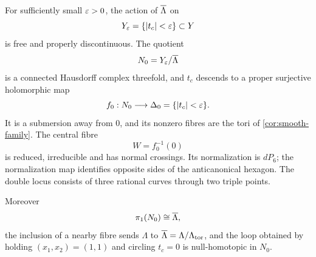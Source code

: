 \begin{theorem}\label{thm:cusp-filling}
For sufficiently small $\varepsilon>0$, the action of $\overline\Lambda$ on
\[
 Y_\varepsilon=\{|t_c|<\varepsilon\}\subset Y
\]
is free and properly discontinuous.  The quotient
\[
 N_0=Y_\varepsilon/\overline\Lambda
\]
is a connected Hausdorff complex threefold, and $t_c$ descends to a proper
surjective holomorphic map
\[
 f_0:N_0\longrightarrow\Delta_0=\{|t_c|<\varepsilon\}.
\]
It is a submersion away from $0$, and its nonzero fibres are the tori of
\cref{cor:smooth-family}.  The central fibre
\[
 W=f_0^{-1}(0)
\]
is reduced, irreducible and has normal crossings.  Its normalization is
$dP_6$; the normalization map identifies opposite sides of the
anticanonical hexagon.  The double locus consists of three rational curves
through two triple points.

Moreover
\[
 \pi_1(N_0)\cong\overline\Lambda,
\]
the inclusion of a nearby fibre sends $\Lambda$ to
$\overline\Lambda=\Lambda/\Lambda_{\mathrm{tor}}$, and the loop obtained by
holding $(x_1,x_2)=(1,1)$ and circling $t_c=0$ is null-homotopic in $N_0$.
\end{theorem}

